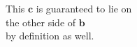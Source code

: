 \documentclass[preview]{standalone}
\renewcommand{\vec}{\mathbf}
\begin{document}
\begin{center}
This $\vec{c}$ is guaranteed to lie on\\the other side of $\vec{b}$\\by definition as well.
\end{center}
\end{document}
